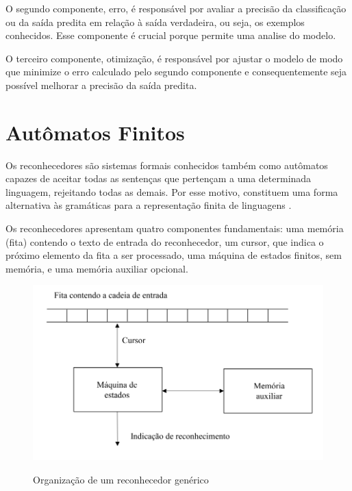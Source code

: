 O segundo componente, erro, é responsável por avaliar a precisão da classificação ou da saída predita em relação à saída verdadeira, ou seja, os exemplos conhecidos. Esse componente é crucial porque permite uma analise do modelo.


O terceiro componente, otimização, é responsável por ajustar o modelo de modo que  minimize o  erro calculado pelo segundo componente e consequentemente seja possível melhorar a precisão da saída predita. 



\section[Autômatos Finitos]{Autômatos Finitos}


Os reconhecedores são sistemas formais conhecidos também como autômatos capazes de aceitar todas as sentenças que pertençam a uma determinada linguagem, rejeitando todas as demais. Por esse motivo, constituem uma forma alternativa às gramáticas para a representação finita de linguagens \cite{reconhecimento}.

Os reconhecedores apresentam quatro componentes fundamentais: uma memória (fita) contendo o texto de entrada do
reconhecedor, um cursor, que indica o próximo elemento da fita a ser processado, uma máquina de estados finitos, sem memória, e uma memória auxiliar opcional.


\begin{figure}[H]
	\centering
    \caption{Organização de um reconhecedor genérico}
	\includegraphics[scale=2]{figuras/AFD/reconhecedor.png}
	\label{fig:Organizacao de um reconhecedor generico}
\end{figure}


